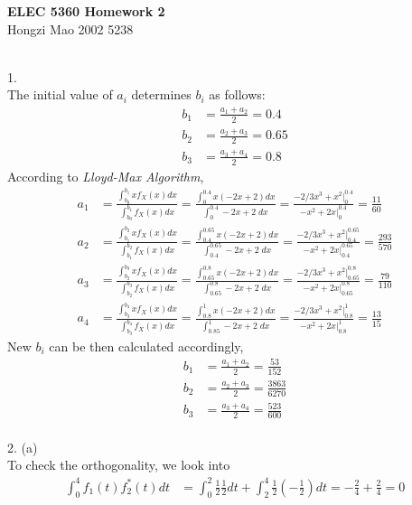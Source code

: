 \documentclass [12pt] {article}
\begin{document}
\begin{spacing}{1.5}
\begin{center}
\small
\textbf{ELEC 5360 Homework 2}\\ Hongzi Mao 2002 5238\\
\end{center}
\normalsize
~\\
1. \\
The initial value of $a_{i}$ determines $b_{i}$ as follows:
\begin{align*}
b_1 & = \frac{a_1+a_2}{2} = 0.4\\
b_2 & = \frac{a_2+a_3}{2} = 0.65\\
b_3 & = \frac{a_3+a_4}{2} = 0.8
\end{align*}
According to \emph{Lloyd-Max Algorithm},
\begin{align*}
a_1 & = \frac{\int_{b_0}^{b_1} x f_X(x) dx}{\int_{b_0}^{b_1} f_X(x) dx} = \frac{\int_{0}^{0.4} x (-2x+2) dx}{\int_{0}^{0.4} -2x+2 \;dx} = \frac{-2/3 x^3 +x^2 \Big|_0^{0.4}}{-x^2 + 2x \Big|_0^{0.4}} = \frac{11}{60}\\
a_2 & = \frac{\int_{b_1}^{b_2} x f_X(x) dx}{\int_{b_1}^{b_2} f_X(x) dx} = \frac{\int_{0.4}^{0.65} x (-2x+2) dx}{\int_{0.4}^{0.65} -2x+2 \;dx} = \frac{-2/3 x^3 +x^2 \Big|_{0.4}^{0.65}}{-x^2 + 2x \Big|_{0.4}^{0.65}} = \frac{293}{570}\\
a_3 & = \frac{\int_{b_2}^{b_3} x f_X(x) dx}{\int_{b_2}^{b_3} f_X(x) dx} = \frac{\int_{0.65}^{0.8} x (-2x+2) dx}{\int_{0.65}^{0.8} -2x+2 \;dx} = \frac{-2/3 x^3 +x^2 \Big|_{0.65}^{0.8}}{-x^2 + 2x \Big|_{0.65}^{0.8}} = \frac{79}{110}\\
a_4 & = \frac{\int_{b_3}^{b_4} x f_X(x) dx}{\int_{b_3}^{b_4} f_X(x) dx} = \frac{\int_{0.8}^{1} x (-2x+2) dx}{\int_{0.85}^{1} -2x+2 \;dx} = \frac{-2/3 x^3 +x^2 \Big|_{0.8}^{1}}{-x^2 + 2x \Big|_{0.8}^{1}} = \frac{13}{15}
\end{align*}
New $b_{i}$ can be then calculated accordingly,
\begin{align*}
b_1 & = \frac{a_1+a_2}{2} = \frac{53}{152}\\
b_2 & = \frac{a_2+a_3}{2} = \frac{3863}{6270}\\
b_3 & = \frac{a_3+a_4}{2} = \frac{523}{600}
\end{align*}
~\\
2. (a)\\
To check the orthogonality, we look into
 \begin{align*}
\int_{0}^{4} f_{1}(t)f_{2}^{*}(t) dt & = \int_{0}^{2} \frac{1}{2}\frac{1}{2} dt + \int_{2}^{4} \frac{1}{2}(-\frac{1}{2}) dt = -\frac{2}{4} + \frac{2}{4} = 0\\

\end{align*}
\end{spacing}
\end{document}
